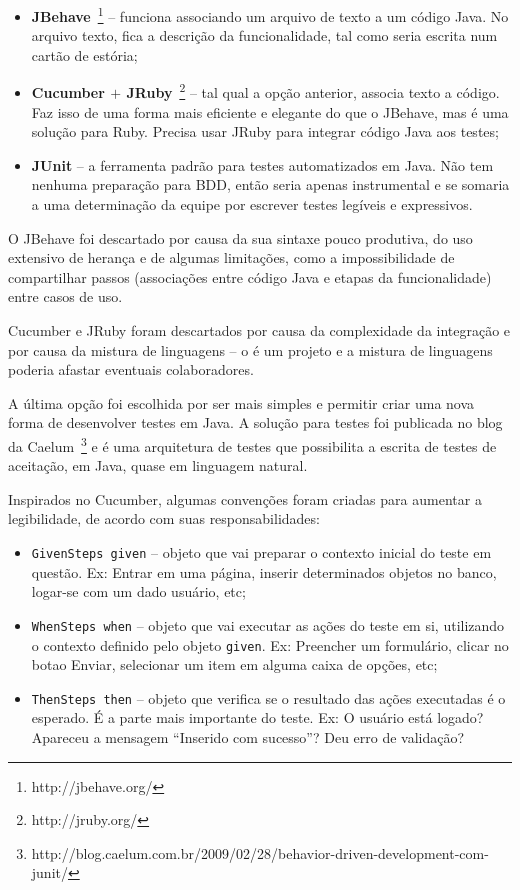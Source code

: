 \begin{itemize}
	\item{\textbf{JBehave}~\footnote{http://jbehave.org/} -- funciona associando um arquivo de texto a um código Java. No arquivo texto, fica a descrição da funcionalidade, tal como seria escrita num cartão de estória;}
	\item{\textbf{Cucumber $+$ JRuby}~\footnote{http://jruby.org/} -- tal qual a opção anterior, associa texto a código. Faz isso de uma forma mais eficiente e elegante do que o JBehave, mas é uma solução para Ruby. Precisa usar JRuby para integrar código Java aos testes;}
	\item{\textbf{JUnit} -- a ferramenta padrão para testes automatizados em Java. Não tem nenhuma preparação para BDD, então seria apenas instrumental e se somaria a uma determinação da equipe por escrever testes legíveis e expressivos.}
\end{itemize}

O JBehave foi descartado por causa da sua sintaxe pouco produtiva, do uso extensivo de herança e de algumas limitações, como a impossibilidade de compartilhar passos (associações entre código Java e etapas da funcionalidade) entre casos de uso.

Cucumber e JRuby foram descartados por causa da complexidade da integração e por causa da mistura de linguagens -- o \calopsita{} é um projeto \opensource{} e a mistura de linguagens poderia afastar eventuais colaboradores.

A última opção foi escolhida por ser mais simples e permitir criar uma nova forma de desenvolver testes em Java. A solução para testes foi publicada no blog da Caelum~\footnote{http://blog.caelum.com.br/2009/02/28/behavior-driven-development-com-junit/} e é uma arquitetura de testes que possibilita a escrita de testes de aceitação, em Java, quase em linguagem natural. 

Inspirados no Cucumber, algumas convenções foram criadas para aumentar a legibilidade, de acordo com suas responsabilidades:

\begin{itemize}
	\item{\texttt{GivenSteps given} -- objeto que vai preparar o contexto inicial do teste em questão. Ex: Entrar em uma página, inserir determinados objetos no banco, logar-se com um dado usuário, etc;}
	\item{\texttt{WhenSteps when} -- objeto que vai executar as ações do teste em si, utilizando o contexto definido pelo objeto \texttt{given}. Ex: Preencher um formulário, clicar no botao Enviar, selecionar um item em alguma caixa de opções, etc;}
	\item{\texttt{ThenSteps then} -- objeto que verifica se o resultado das ações executadas é o esperado. É a parte mais importante do teste. Ex: O usuário está logado? Apareceu a mensagem ``Inserido com sucesso''? Deu erro de validação?}
\end{itemize}

